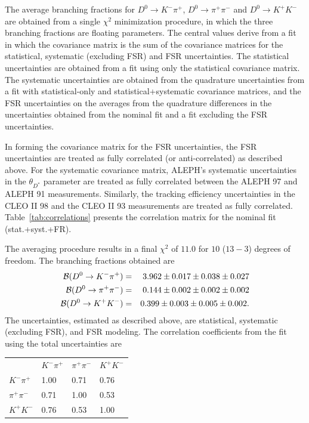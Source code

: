 The average branching fractions for $D^0\to K^-\pi^+$, $D^0\to \pi^+\pi^-$ and 
$D^0\to K^+ K^-$ are obtained from
a single $\chi^2$ minimization procedure, in which the three branching 
fractions are floating parameters. The
central values derive from a fit in which the covariance matrix is the sum 
of the covariance matrices for the
statistical, systematic (excluding FSR) and FSR uncertainties.  The 
statistical uncertainties are obtained from
a fit using only the statistical covariance matrix.  The systematic 
uncertainties are obtained from the
quadrature uncertainties from a fit with statistical-only and 
statistical+systematic covariance matrices, and
the FSR uncertainties on the averages from the quadrature 
differences in the uncertainties obtained from the
nominal fit and a fit excluding the FSR uncertainties.

In forming the covariance matrix for the FSR uncertainties, the FSR
uncertainties are treated as fully correlated (or anti-correlated) as 
described above.  For the systematic covariance matrix, ALEPH's systematic
uncertainties in the $\theta_{D^*}$ parameter are treated
as fully correlated between the ALEPH 97 and ALEPH 91 measurements.  Similarly,
the tracking efficiency uncertainties in the CLEO II 98 and the
CLEO II 93 measurements are treated as fully correlated.  
Table~\ref{tab:correlations} presents the correlation matrix for 
the nominal fit (stat.+syst.+FR).

The averaging procedure results in a 
final $\chi^2$ of $11.0$ for $10$ ($13-3$) degrees 
of freedom.  The branching
fractions obtained are
\begin{eqnarray*}
  {\cal B}(D^0\to K^-\pi^+)   & = & 3.962 \pm 0.017 \pm 0.038 \pm 0.027 \\
  {\cal B}(D^0\to \pi^+\pi^-) & = & 0.144 \pm 0.002 \pm 0.002 \pm 0.002 \\
  {\cal B}(D^0\to K^+ K^-)    & = & 0.399 \pm 0.003 \pm 0.005 \pm 0.002. 
\end{eqnarray*}The uncertainties, estimated as described above, are statistical, 
systematic (excluding FSR), and
FSR modeling.  The correlation coefficients from the fit using the 
total uncertainties are
\begin{center}
\begin{tabular}{llll}
               & $K^-\pi^+$ & $\pi^+\pi^-$ & $K^+ K^-$ \\
$K^-\pi^+$     &  1.00 & 0.71 & 0.76  \\
$\pi^+\pi^-$   &  0.71 & 1.00 & 0.53  \\
$K^+ K^-$      &  0.76 & 0.53 & 1.00  \\
\end{tabular}
\end{center}

